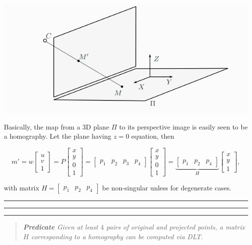 \documentclass[10pt]{report}
\begin{document}
\begin{center}
\includegraphics[width=.9\linewidth]{./pics/cal/zhang-homography.jpg}
\end{center}

Basically, the map from a 3D plane \(\Pi\) to its perspective image is
easily seen to be a homography. Let the plane having \(z=0\) equation,
then

\[ m' = w\begin{bmatrix} u \\ v \\ 1\end{bmatrix} = P\begin{bmatrix} x \\ y \\ 0 \\ 1 \end{bmatrix} = \begin{bmatrix}p_1 & p_2 & p_3 & p_4 \end{bmatrix} \begin{bmatrix} x \\ y \\ 0 \\ 1\end{bmatrix} = \underbrace{\begin{bmatrix}p_1 & p_2 & p_4\end{bmatrix}}_{H} \begin{bmatrix} x \\ y \\ 1\end{bmatrix},\]

with matrix \(H=\begin{bmatrix} p_1 & p_2 & p_4 \end{bmatrix}\) be
non-singular unless for degenerate cases.

\vspace*{0.6cm}\hrule
\hrule
\hrule
\vspace*{0.4cm}

\begin{quote}
\emph{\textbf{Predicate} Given at least \(4\) pairs of original and projected points, a matrix \(H\) corresponding to a homography can be computed via DLT.}
\end{quote}
\end{document}
